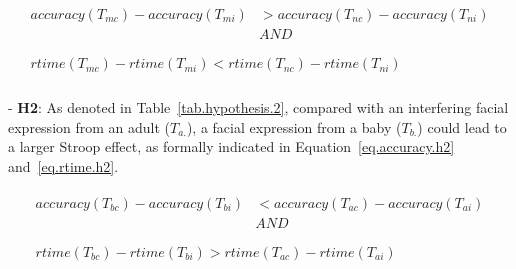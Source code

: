 \begin{align}
\begin{split}\label{eq.accuracy.h1}
\mathit{accuracy}(T_{mc})-\mathit{accuracy}(T_{mi})&>
\mathit{accuracy}(T_{nc})-\mathit{accuracy}(T_{ni})\\
&\mathit{AND}\\
\end{split}\\
\begin{split}\label{eq.rtime.h1}
\mathit{rtime}(T_{mc})-\mathit{rtime}(T_{mi})<
\mathit{rtime}(T_{nc})-\mathit{rtime}(T_{ni})\\
\end{split}
\end{align}


\begin{table}
\centering
{}
\caption{Subsets defined for hypothesis 2.}
\label{tab.hypothesis.2}
\end{table}


\noindent - \textbf{H2}:
As denoted in Table~\ref{tab.hypothesis.2},
compared with an interfering facial expression from an adult ($T_{a.}$),
a facial expression from a baby ($T_{b.}$) could lead to
a larger Stroop effect, as formally indicated in Equation~\ref{eq.accuracy.h2} and~\ref{eq.rtime.h2}.

\begin{align}
\begin{split}\label{eq.accuracy.h2}
\mathit{accuracy}(T_{bc})-\mathit{accuracy}(T_{bi})&<
\mathit{accuracy}(T_{ac})-\mathit{accuracy}(T_{ai})\\
&\mathit{AND}\\
\end{split}\\
\begin{split}\label{eq.rtime.h2}
\mathit{rtime}(T_{bc})-\mathit{rtime}(T_{bi})>
\mathit{rtime}(T_{ac})-\mathit{rtime}(T_{ai})\\
\end{split}
\end{align}

